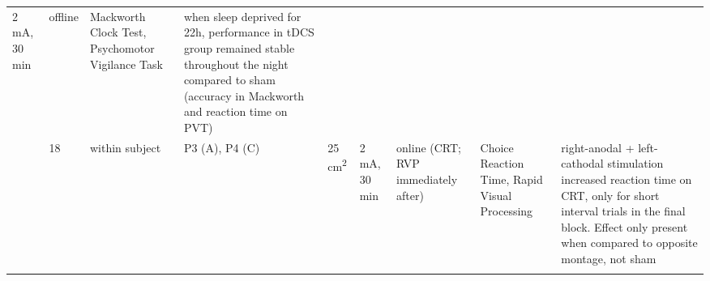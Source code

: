\documentclass[11pt,english,]{memoir}
\begin{document}
\begin{longtable}[]{@{}lllllllll@{}}
\begin{minipage}[t]{0.05\columnwidth}
2 mA, 30
min\strut
\end{minipage} & \begin{minipage}[t]{0.06\columnwidth}\raggedright
offline\strut
\end{minipage} & \begin{minipage}[t]{0.11\columnwidth}\raggedright
Mackworth Clock Test,
Psychomotor Vigilance
Task\strut
\end{minipage} & \begin{minipage}[t]{0.24\columnwidth}\raggedright
when sleep deprived for 22h, performance in tDCS group
remained stable throughout the night compared to sham
(accuracy in Mackworth and reaction time on PVT)\strut
\end{minipage}\tabularnewline
\begin{minipage}[t]{0.08\columnwidth}\raggedright
\textcite{Li2015a}\strut
\end{minipage} & \begin{minipage}[t]{0.02\columnwidth}\raggedright
18\strut
\end{minipage} & \begin{minipage}[t]{0.04\columnwidth}\raggedright
within
subject\strut
\end{minipage} & \begin{minipage}[t]{0.13\columnwidth}\raggedright
P3 (A), P4 (C)\strut
\end{minipage} & \begin{minipage}[t]{0.03\columnwidth}\raggedright
25
cm\textsuperscript{2}\strut
\end{minipage} & \begin{minipage}[t]{0.05\columnwidth}\raggedright
2 mA, 30
min\strut
\end{minipage} & \begin{minipage}[t]{0.06\columnwidth}\raggedright
online
(CRT;
RVP
immediately
after)\strut
\end{minipage} & \begin{minipage}[t]{0.11\columnwidth}\raggedright
Choice Reaction Time,
Rapid Visual Processing\strut
\end{minipage} & \begin{minipage}[t]{0.24\columnwidth}\raggedright
right-anodal + left-cathodal stimulation increased
reaction time on CRT, only for short interval trials in
the final block. Effect only present when compared to
opposite montage, not sham\strut
\end{minipage}\tabularnewline
\begin{minipage}[t]{0.08\columnwidth}\raggedright

\end{minipage}
\end{longtable}
\end{document}
